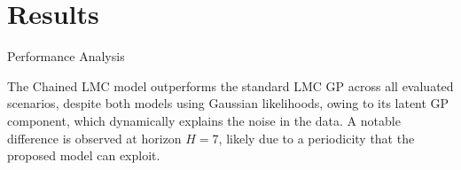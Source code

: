 \section{Results}

\begin{frame}{Performance Analysis}
	
 The Chained LMC model outperforms the standard LMC GP across all evaluated scenarios, despite both models using Gaussian likelihoods, owing to its latent GP component, which dynamically explains the noise in the data. A notable difference is observed at horizon \(H = 7\), likely due to a periodicity that the proposed model can exploit. 
\begin{figure}[htbp]
	\centering
	
\end{figure}

\end{frame}

